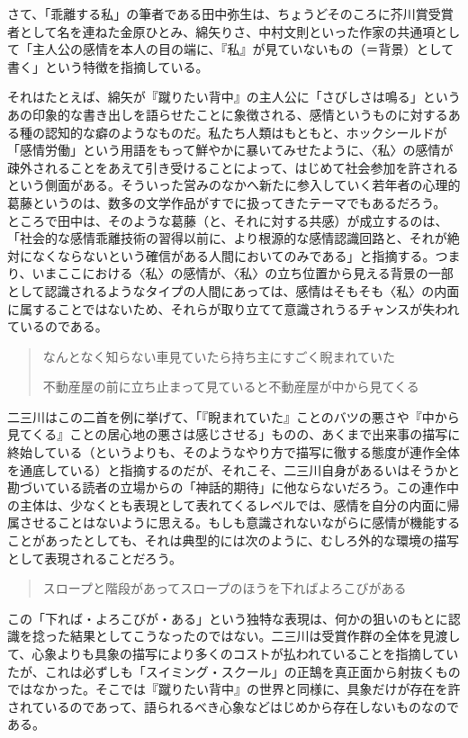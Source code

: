 \documentclass[uplatex,a4paper,oneside,landscape]{jsarticle}
\begin{document}
さて、「乖離する私」の筆者である⽥中弥⽣は、ちょうどそのころに芥川賞受賞者として名を連ねた⾦原ひとみ、綿⽮りさ、中村⽂則といった作家の共通項として「主⼈公の感情を本⼈の⽬の端に、『私』が⾒ていないもの（＝背景）として書く」という特徴を指摘している。

それはたとえば、綿⽮が『蹴りたい背中』の主⼈公に「さびしさは鳴る」というあの印象的な書き出しを語らせたことに象徴される、感情というものに対するある種の認知的な癖のようなものだ。私たち⼈類はもともと、ホックシールドが「感情労働」という⽤語をもって鮮やかに暴いてみせたように、〈私〉の感情が疎外されることをあえて引き受けることによって、はじめて社会参加を許されるという側⾯がある。そういった営みのなかへ新たに参⼊していく若年者の⼼理的葛藤というのは、数多の⽂学作品がすでに扱ってきたテーマでもあるだろう。
ところで⽥中は、そのような葛藤（と、それに対する共感）が成⽴するのは、「社会的な感情乖離技術の習得以前に、より根源的な感情認識回路と、それが絶対になくならないという確信がある⼈間においてのみである」と指摘する。つまり、いまここにおける〈私〉の感情が、〈私〉の⽴ち位置から⾒える背景の⼀部として認識されるようなタイプの⼈間にあっては、感情はそもそも〈私〉の内⾯に属することではないため、それらが取り⽴てて意識されうるチャンスが失われているのである。

\begin{quote}
なんとなく知らない⾞⾒ていたら持ち主にすごく睨まれていた

不動産屋の前に⽴ち⽌まって⾒ていると不動産屋が中から⾒てくる
\end{quote}

⼆三川はこの⼆⾸を例に挙げて、「『睨まれていた』ことのバツの悪さや『中から⾒てくる』ことの居⼼地の悪さは感じさせる」ものの、あくまで出来事の描写に終始している（というよりも、そのようなやり⽅で描写に徹する態度が連作全体を通底している）と指摘するのだが、それこそ、⼆三川⾃⾝があるいはそうかと勘づいている読者の⽴場からの「神話的期待」に他ならないだろう。この連作中の主体は、少なくとも表現として表れてくるレベルでは、感情を⾃分の内⾯に帰属させることはないように思える。もしも意識されないながらに感情が機能することがあったとしても、それは典型的には次のように、むしろ外的な環境の描写として表現されることだろう。

\begin{quote}
スロープと階段があってスロープのほうを下ればよろこびがある
\end{quote}

この「下れば・よろこびが・ある」という独特な表現は、何かの狙いのもとに認識を捻った結果としてこうなったのではない。⼆三川は受賞作群の全体を⾒渡して、⼼象よりも具象の描写により多くのコストが払われていることを指摘していたが、これは必ずしも「スイミング・スクール」の正鵠を真正⾯から射抜くものではなかった。そこでは『蹴りたい背中』の世界と同様に、具象だけが存在を許されているのであって、語られるべき⼼象などはじめから存在しないものなのである。
\end{document}

